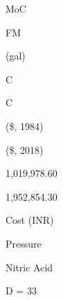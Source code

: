 \documentclass[a4paper,portrait,12pt]{article}
\begin{document}
\begin{flushleft}
MoC
\end{flushleft}





\begin{flushleft}
FM
\end{flushleft}





\begin{flushleft}
(gal)
\end{flushleft}





\begin{flushleft}
C
\end{flushleft}





\begin{flushleft}
C
\end{flushleft}





(\$, 1984)





(\$, 2018)





1,019,978.60





1,952,854.30





\begin{flushleft}
Cost (INR)
\end{flushleft}





\begin{flushleft}
Pressure
\end{flushleft}


\begin{flushleft}
Nitric Acid
\end{flushleft}





\begin{flushleft}
D = 33
\end{flushleft}
\end{document}
